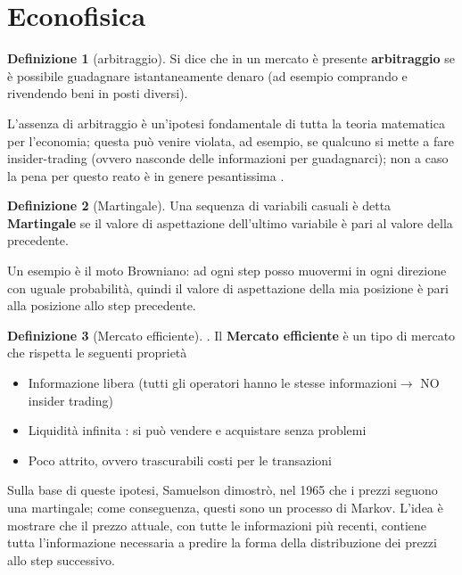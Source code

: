 \documentclass[a4paper,12pt]{article}
\theoremstyle{plain}
\theoremstyle{definition}
\newtheorem{defn}{Definizione}[section]
\theoremstyle{remark}
\begin{document}
\part{Econofisica}
\begin{defn}[arbitraggio]
Si dice che in un mercato è presente \textbf{arbitraggio} se è possibile guadagnare istantaneamente denaro (ad esempio comprando e rivendendo beni in posti diversi).



\end{defn}
L'assenza di arbitraggio è un'ipotesi fondamentale di tutta la teoria matematica per l'economia; questa può venire violata, ad esempio, se qualcuno si mette a fare insider-trading (ovvero nasconde delle informazioni per guadagnarci); non a caso la pena per questo reato è in genere pesantissima .
\begin{defn}[Martingale]\label{Martina}
Una sequenza di variabili casuali è detta \textbf{Martingale} se il valore di aspettazione dell'ultimo variabile è pari al valore della precedente. 
\end{defn}
Un esempio è il moto Browniano: ad ogni step posso muovermi in ogni direzione con uguale probabilità, quindi il valore di aspettazione della mia posizione è pari alla posizione allo step precedente.
\begin{defn}[Mercato efficiente].
	Il 	\textbf{Mercato efficiente} è un tipo di mercato che rispetta le seguenti proprietà
	\begin{itemize}
		\item Informazione libera (tutti gli operatori hanno le stesse informazioni$\rightarrow$ NO insider trading)
		\item Liquidità infinita : si può vendere e acquistare senza problemi
		\item  Poco attrito, ovvero trascurabili costi per le transazioni
	\end{itemize}




\end{defn}
Sulla base di queste ipotesi, Samuelson dimostrò, nel 1965 che i prezzi seguono una martingale; come conseguenza, questi sono un processo di Markov.
L'idea è mostrare che il prezzo attuale, con tutte le informazioni più recenti, contiene tutta l'informazione necessaria a predire la forma della distribuzione dei prezzi allo step successivo.\\
\end{document}
